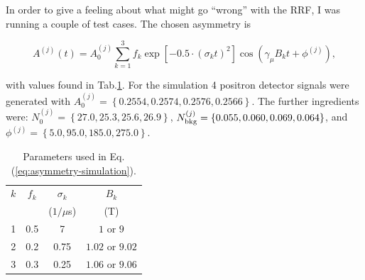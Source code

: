 \documentclass[twoside]{article}
\begin{document}
In order to give a feeling about what might go ``wrong'' with the RRF, I was running a couple of test cases. The chosen asymmetry is

\begin{equation}\label{eq:asymmetry-simulation}
 A^{(j)}(t) =  A_0^{(j)} \sum_{k=1}^3 f_k \exp\left[-0.5\cdot (\sigma_k t)^2 \right] \cos(\gamma_\mu B_k t + \phi^{(j)}),
\end{equation}

\noindent with values found in Tab.\ref{tab:asymmetry-parameters}. For the simulation 4 positron detector signals were generated with 
$A_0^{(j)} = \left\{ 0.2554, 0.2574, 0.2576, 0.2566 \right\}$. The further ingredients were: $N_0^{(j)} = \left\{ 27.0, 25.3, 25.6, 26.9 \right\}$,
$N_{\rm bkg}^{(j)} = \left\{ 0.055, 0.060, 0.069, 0.064 \right\}$, and $ \phi^{(j)} = \left\{ 5.0, 95.0, 185.0, 275.0 \right\}$.

\begin{table}[h]
 \centering
 \begin{tabular}{c|c|c|c}
   $k$ & $f_k$ & $\sigma_k$ & $B_k$ \\ 
       &       & ($1/\mu$s) & (T)   \\ \hline\hline
    1  & 0.5   & 7          & $1$ or $9$ \\
    2  & 0.2   & 0.75       & $1.02$ or $9.02$ \\
    3  & 0.3   & 0.25       & $1.06$ or $9.06$
 \end{tabular}
 \caption{Parameters used in Eq.(\ref{eq:asymmetry-simulation}).}\label{tab:asymmetry-parameters}
\end{table}
 
\end{document}
